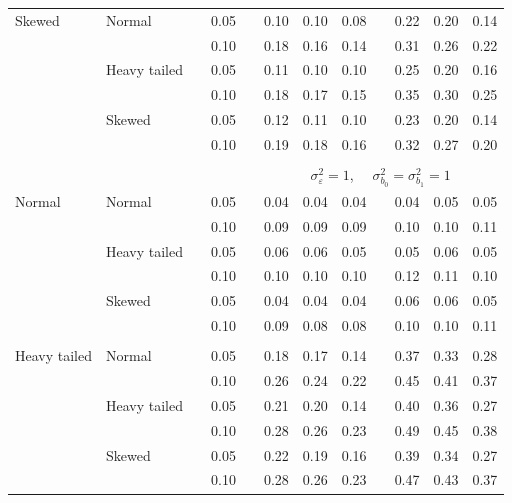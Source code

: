 \documentclass[12pt]{article} %
\begin{document}
\begin{table}[ht]
\begin{scriptsize}
\begin{center}
\begin{tabular}{ll p{.1cm} c p{.1cm} rrr p{.1cm} rrr}
Skewed       & Normal       && 0.05 &&   0.10 & 0.10 & 0.08 && 0.22 & 0.20 & 0.14 \\ 
             &              && 0.10 &&   0.18 & 0.16 & 0.14 && 0.31 & 0.26 & 0.22 \\ 
             & Heavy tailed && 0.05 &&   0.11 & 0.10 & 0.10 && 0.25 & 0.20 & 0.16 \\ 
             &              && 0.10 &&   0.18 & 0.17 & 0.15 && 0.35 & 0.30 & 0.25 \\ 
             & Skewed       && 0.05 &&   0.12 & 0.11 & 0.10 && 0.23 & 0.20 & 0.14 \\ 
             &              && 0.10 &&   0.19 & 0.18 & 0.16 && 0.32 & 0.27 & 0.20 \\ 

&&&&&&&&&&&\\
& && && \multicolumn{7}{c}{$\sigma_{\varepsilon}^2 = 1$, \ \ $\sigma_{b_0}^2 = \sigma_{b_1}^2 = 1$} \\ \cline{6-12}
\rowcolor{gray!20}Normal       & Normal       && 0.05 &&   0.04 & 0.04 & 0.04 && 0.04 & 0.05 & 0.05 \\ 
\rowcolor{gray!20}             &              && 0.10 &&   0.09 & 0.09 & 0.09 && 0.10 & 0.10 & 0.11 \\ 
\rowcolor{gray!20}             & Heavy tailed && 0.05 &&   0.06 & 0.06 & 0.05 && 0.05 & 0.06 & 0.05 \\ 
\rowcolor{gray!20}             &              && 0.10 &&   0.10 & 0.10 & 0.10 && 0.12 & 0.11 & 0.10 \\ 
\rowcolor{gray!20}             & Skewed       && 0.05 &&   0.04 & 0.04 & 0.04 && 0.06 & 0.06 & 0.05 \\ 
\rowcolor{gray!20}             &              && 0.10 &&   0.09 & 0.08 & 0.08 && 0.10 & 0.10 & 0.11 \\ 
             &&&&&&&&&&&\\
Heavy tailed & Normal       && 0.05 &&   0.18 & 0.17 & 0.14 && 0.37 & 0.33 & 0.28 \\ 
             &              && 0.10 &&   0.26 & 0.24 & 0.22 && 0.45 & 0.41 & 0.37 \\ 
             & Heavy tailed && 0.05 &&   0.21 & 0.20 & 0.14 && 0.40 & 0.36 & 0.27 \\ 
             &              && 0.10 &&   0.28 & 0.26 & 0.23 && 0.49 & 0.45 & 0.38 \\ 
             & Skewed       && 0.05 &&   0.22 & 0.19 & 0.16 && 0.39 & 0.34 & 0.27 \\ 
             &              && 0.10 &&   0.28 & 0.26 & 0.23 && 0.47 & 0.43 & 0.37 \\ 

\end{tabular}
\end{center}
\end{scriptsize}
\end{table}
\end{document}
